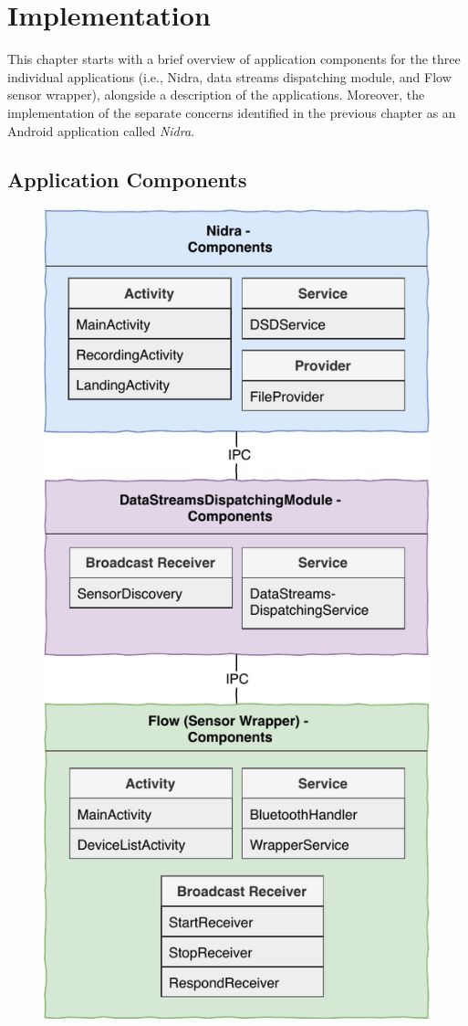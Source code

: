 \chapter{Implementation}
This chapter starts with a brief overview of application components for the three individual applications (i.e., Nidra, data streams dispatching module, and Flow sensor wrapper), alongside a description of the applications. Moreover, the implementation of the separate concerns identified in the previous chapter as an Android application called \textit{Nidra}. 

\section{Application Components} \label{impl:appcomp}

\begin{figure}
    \centering
    \includegraphics[scale=0.95]{images/AndroidComponents.pdf}

\end{figure}
